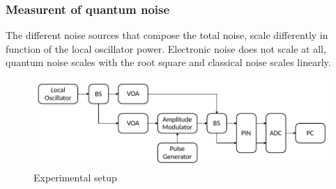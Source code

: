 \subsubsection{Measurent of quantum noise}
%
The different noise sources that compose the total noise, scale differently in function of the local oscillator power.
Electronic noise does not scale at all, quantum noise scales with the root square and classical noise scales linearly.
%
%
%
%
\begin{figure}[H]
	\centering
	\includegraphics{./sdf/quantum_noise/figures/scheme_experimental.pdf}
	\caption{Experimental setup}
	\label{fig:experimental_homodyne_setup}
\end{figure}


\renewcommand{\bibname}{References}
%


%
%


\cleardoublepage
